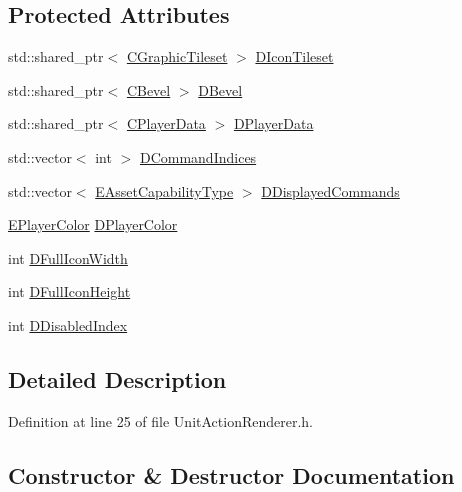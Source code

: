 \subsection*{Protected Attributes}
\begin{DoxyCompactItemize}
\item 
std\+::shared\+\_\+ptr$<$ \hyperlink{classCGraphicTileset}{C\+Graphic\+Tileset} $>$ \hyperlink{classCUnitActionRenderer_a3f5f7cf1840e1aa4b28ab507404a6b3a}{D\+Icon\+Tileset}
\item 
std\+::shared\+\_\+ptr$<$ \hyperlink{classCBevel}{C\+Bevel} $>$ \hyperlink{classCUnitActionRenderer_a3f4012557f7f4d71cfa02df725984ebb}{D\+Bevel}
\item 
std\+::shared\+\_\+ptr$<$ \hyperlink{classCPlayerData}{C\+Player\+Data} $>$ \hyperlink{classCUnitActionRenderer_a77f8e3045992a48b27ad6e45d48a7b91}{D\+Player\+Data}
\item 
std\+::vector$<$ int $>$ \hyperlink{classCUnitActionRenderer_a73eebe87330693c8546ea14c23672859}{D\+Command\+Indices}
\item 
std\+::vector$<$ \hyperlink{GameDataTypes_8h_a35b98ce26aca678b03c6f9f76e4778ce}{E\+Asset\+Capability\+Type} $>$ \hyperlink{classCUnitActionRenderer_a194c87c9f3280485f4abceb8d39853b3}{D\+Displayed\+Commands}
\item 
\hyperlink{GameDataTypes_8h_aafb0ca75933357ff28a6d7efbdd7602f}{E\+Player\+Color} \hyperlink{classCUnitActionRenderer_a092d5c46d431f75499b194dc7b385ceb}{D\+Player\+Color}
\item 
int \hyperlink{classCUnitActionRenderer_a67e5c1650ef8f849c05d9f059d12fb95}{D\+Full\+Icon\+Width}
\item 
int \hyperlink{classCUnitActionRenderer_a11b30763b92ed0cbfb842f86fe76fe26}{D\+Full\+Icon\+Height}
\item 
int \hyperlink{classCUnitActionRenderer_abf505a324f367378f8c30ddd48bb6549}{D\+Disabled\+Index}
\end{DoxyCompactItemize}


\subsection{Detailed Description}


Definition at line 25 of file Unit\+Action\+Renderer.\+h.



\subsection{Constructor \& Destructor Documentation}
\hypertarget{classCUnitActionRenderer_abb0ea5e618b723ffc9777edf8e6cc07e}{}\label{classCUnitActionRenderer_abb0ea5e618b723ffc9777edf8e6cc07e} 
